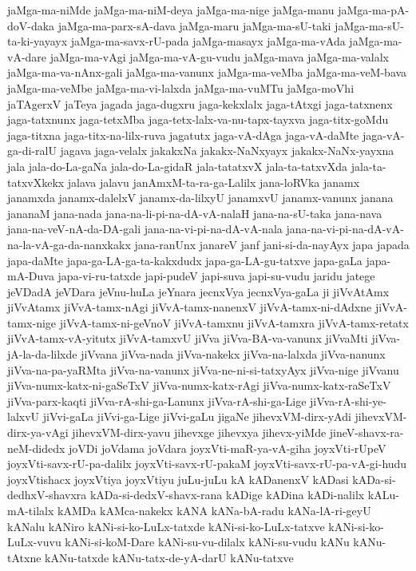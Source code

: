{jaMga-ma-niMde
jaMga-ma-niM-deya
jaMga-ma-nige
jaMga-manu
jaMga-ma-pA-doV-daka
jaMga-ma-parx-sA-dava
jaMga-maru
jaMga-ma-sU-taki
jaMga-ma-sU-ta-ki-yayayx
jaMga-ma-savx-rU-pada
jaMga-masayx
jaMga-ma-vAda
jaMga-ma-vA-dare
jaMga-ma-vAgi
jaMga-ma-vA-gu-vudu
jaMga-mava
jaMga-ma-valalx
jaMga-ma-va-nAnx-gali
jaMga-ma-vanunx
jaMga-ma-veMba
jaMga-ma-veM-bava
jaMga-ma-veMbe
jaMga-ma-vi-lalxda
jaMga-ma-vuMTu
jaMga-moVhi
jaTAgerxV
jaTeya
jagada
jaga-dugxru
jaga-kekxlalx
jaga-tAtxgi
jaga-tatxnenx
jaga-tatxnunx
jaga-tetxMba
jaga-tetx-lalx-va-nu-tapx-tayxva
jaga-titx-goMdu
jaga-titxna
jaga-titx-na-lilx-ruva
jagatutx
jaga-vA-dAga
jaga-vA-daMte
jaga-vA-ga-di-ralU
jagava
jaga-velalx
jakakxNa
jakakx-NaNxyayx
jakakx-NaNx-yayxna
jala
jala-do-La-gaNa
jala-do-La-gidaR
jala-tatatxvX
jala-ta-tatxvXda
jala-ta-tatxvXkekx
jalava
jalavu
janAmxM-ta-ra-ga-Lalilx
jana-loRVka
janamx
janamxda
janamx-dalelxV
janamx-da-lilxyU
janamxvU
janamx-vanunx
janana
jananaM
jana-nada
jana-na-li-pi-na-dA-vA-nalaH
jana-na-sU-taka
jana-nava
jana-na-veV-nA-da-DA-gali
jana-na-vi-pi-na-dA-vA-nala
jana-na-vi-pi-na-dA-vA-na-la-vA-ga-da-nanxkakx
jana-ranUnx
janareV
janf
jani-si-da-nayAyx
japa
japada
japa-daMte
japa-ga-LA-ga-ta-kakxdudx
japa-ga-LA-gu-tatxve
japa-gaLa
japa-mA-Duva
japa-vi-ru-tatxde
japi-pudeV
japi-suva
japi-su-vudu
jaridu
jatege
jeVDadA
jeVDara
jeVnu-huLa
jeYnara
jecnxVya
jecnxVya-gaLa
ji
jiVvAtAmx
jiVvAtamx
jiVvA-tamx-nAgi
jiVvA-tamx-nanenxV
jiVvA-tamx-ni-dAdxne
jiVvA-tamx-nige
jiVvA-tamx-ni-geVnoV
jiVvA-tamxnu
jiVvA-tamxra
jiVvA-tamx-retatx
jiVvA-tamx-vA-yitutx
jiVvA-tamxvU
jiVva
jiVva-BA-va-vanunx
jiVvaMti
jiVva-jA-la-da-lilxde
jiVvana
jiVva-nada
jiVva-nakekx
jiVva-na-lalxda
jiVva-nanunx
jiVva-na-pa-yaRMta
jiVva-na-vanunx
jiVva-ne-ni-si-tatxyAyx
jiVva-nige
jiVvanu
jiVva-numx-katx-ni-gaSeTxV
jiVva-numx-katx-rAgi
jiVva-numx-katx-raSeTxV
jiVva-parx-kaqti
jiVva-rA-shi-ga-Lanunx
jiVva-rA-shi-ga-Lige
jiVva-rA-shi-ye-lalxvU
jiVvi-gaLa
jiVvi-ga-Lige
jiVvi-gaLu
jigaNe
jihevxVM-dirx-yAdi
jihevxVM-dirx-ya-vAgi
jihevxVM-dirx-yavu
jihevxge
jihevxya
jihevx-yiMde
jineV-shavx-ra-neM-didedx
joVDi
joVdama
joVdara
joyxVti-maR-ya-vA-giha
joyxVti-rUpeV
joyxVti-savx-rU-pa-dalilx
joyxVti-savx-rU-pakaM
joyxVti-savx-rU-pa-vA-gi-hudu
joyxVtishacx
joyxVtiya
joyxVtiyu
juLu-juLu
kA
kADanenxV
kADasi
kADa-si-dedhxV-shavxra
kADa-si-dedxV-shavx-rana
kADige
kADina
kADi-nalilx
kALu-mA-tilalx
kAMDa
kAMca-nakekx
kANA
kANa-bA-radu
kANa-lA-ri-geyU
kANalu
kANiro
kANi-si-ko-LuLx-tatxde
kANi-si-ko-LuLx-tatxve
kANi-si-ko-LuLx-vuvu
kANi-si-koM-Dare
kANi-su-vu-dilalx
kANi-su-vudu
kANu
kANu-tAtxne
kANu-tatxde
kANu-tatx-de-yA-darU
kANu-tatxve
}
